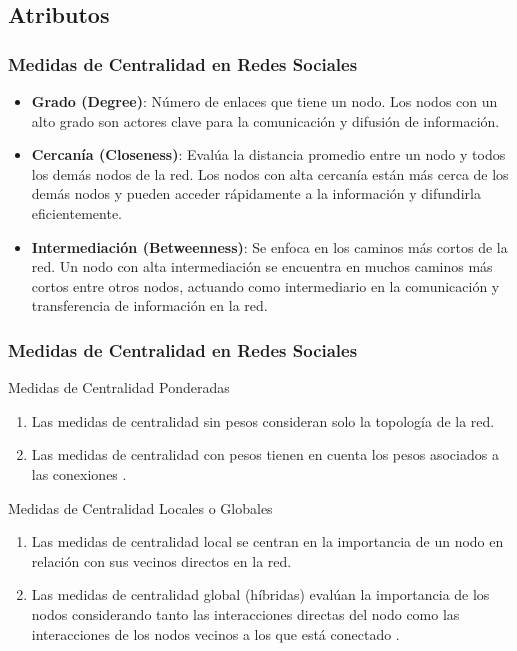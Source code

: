 \documentclass{beamer}
\begin{document}
\subsection{Atributos}

\begin{frame}
	\frametitle{Medidas de Centralidad en Redes Sociales}
	
	\begin{itemize}
		\item \textbf{Grado (Degree)}: Número de enlaces que tiene un nodo. Los nodos con un alto grado son actores clave para la comunicación y difusión de información.
		
		\item \textbf{Cercanía (Closeness)}: Evalúa la distancia promedio entre un nodo y todos los demás nodos de la red. Los nodos con alta cercanía están más cerca de los demás nodos y pueden acceder rápidamente a la información y difundirla eficientemente.
		
		\item \textbf{Intermediación (Betweenness)}: Se enfoca en los caminos más cortos de la red. Un nodo con alta intermediación se encuentra en muchos caminos más cortos entre otros nodos, actuando como intermediario en la comunicación y transferencia de información en la red.
	\end{itemize}
	
\end{frame}


\begin{frame}
	\frametitle{Medidas de Centralidad en Redes Sociales}
	
	\begin{block}{Medidas de Centralidad Ponderadas}
		\begin{enumerate}
			\item Las medidas de centralidad sin pesos consideran solo la topología de la red.
			\item Las medidas de centralidad con pesos tienen en cuenta los pesos asociados a las conexiones \citep{tang2010a, barrat2004a} .
		\end{enumerate}
	\end{block}
	
	\begin{block}{Medidas de Centralidad Locales o Globales}
		\begin{enumerate}
			\item Las medidas de centralidad local se centran en la importancia de un nodo en relación con sus vecinos directos en la red.
			\item Las medidas de centralidad global (híbridas) evalúan la importancia de los nodos considerando tanto las interacciones directas del nodo como las interacciones de los nodos vecinos a los que está conectado \citep{abbasi2013a, Mahmoud_2021}.
		\end{enumerate}
	\end{block}
	
\end{frame}
\end{document}

